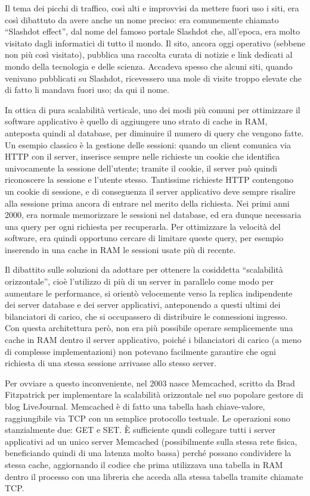 Il tema dei picchi di traffico, così alti e improvvisi da mettere fuori uso i siti,
era così dibattuto da avere anche un nome preciso: era comunemente chiamato ``Slashdot
effect'', dal nome del famoso portale Slashdot che, all'epoca, era molto visitato dagli
informatici di tutto il mondo. Il sito, ancora oggi operativo (sebbene non più così
visitato), pubblica una raccolta curata di notizie e link dedicati al mondo della tecnologia
e delle scienza. Accadeva spesso che alcuni siti, quando venivano pubblicati su Slashdot,
ricevessero una mole di visite troppo elevate che di fatto li mandava fuori uso; da qui
il nome.

In ottica di pura scalabilità verticale, uno dei modi più comuni per ottimizzare il software
applicativo è quello di aggiungere uno strato di cache in RAM, anteposta quindi al database,
per diminuire il numero di query che vengono fatte. Un esempio classico è la gestione delle
sessioni: quando un client comunica via HTTP con il server, inserisce sempre nelle richieste
un cookie che identifica univocamente la sessione dell'utente; tramite il cookie, il server
può quindi riconoscere la sessione e l'utente stesso. Tantissime richieste HTTP contengono un
cookie di sessione, e di conseguenza il server applicativo deve sempre risalire alla sessione
prima ancora di entrare nel merito della richiesta. Nei primi anni 2000, era normale memorizzare
le sessioni nel database, ed era dunque necessaria una query per ogni richiesta per recuperarla.
Per ottimizzare la velocità del software, era quindi opportuno cercare di limitare queste query, per esempio inserendo in una cache in RAM le sessioni usate più di recente.

Il dibattito sulle soluzioni da adottare per ottenere la cosiddetta ``scalabilità orizzontale'',
cioè l'utilizzo di più di un server in parallelo come modo per aumentare le performance,
si orientò velocemente verso la replica indipendente dei server database
e dei server applicativi, anteponendo a questi ultimi dei bilanciatori di carico, che
si occupassero di distribuire le connessioni ingresso. Con questa architettura però,
non era più possibile operare semplicemente una cache in RAM dentro il server applicativo, poiché i bilanciatori di carico (a meno di complesse implementazioni) non potevano facilmente garantire
che ogni richiesta di una stessa sessione arrivasse allo stesso server.

Per ovviare a questo inconveniente, nel 2003 nasce Memcached, scritto da Brad Fitzpatrick per implementare la scalabilità orizzontale nel suo popolare gestore di blog LiveJournal.
Memcached è di fatto una tabella hash chiave-valore, raggiungibile via TCP con un
semplice protocollo testuale. Le operazioni sono stanzialmente due: GET e SET. È sufficiente
qundi collegare tutti i server applicativi ad un unico server Memcached (possibilmente
sulla stessa rete fisica, beneficiando quindi di una latenza molto bassa) perché possano
condividere la stessa cache, aggiornando il codice che prima utilizzava una tabella in RAM
dentro il processo con una libreria che acceda alla stessa tabella tramite chiamate TCP.

